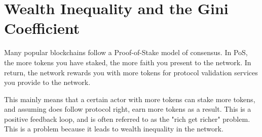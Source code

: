 \section{Wealth Inequality and the Gini Coefficient}

Many popular blockchains follow a Proof-of-Stake model of consensus. In PoS, the more tokens you have staked, the more faith you present to the network. In return, the network rewards you with more tokens for protocol validation services you provide to the network. 

This mainly means that a certain actor with more tokens can stake more tokens, and assuming does follow protocol right, earn more tokens as a result. This is a positive feedback loop, and is often referred to as the "rich get richer" problem. This is a problem because it leads to wealth inequality in the network.
